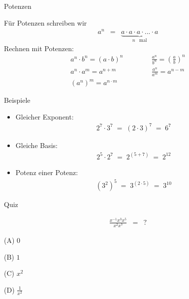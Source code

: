 \documentclass[german]{beamer}
\newcommand{\bq}{\begin{eqnarray*}}
\newcommand{\eq}{\end{eqnarray*}}
\begin{document}
\begin{frame}{Potenzen}

F\"ur Potenzen schreiben wir
\bq
 a^n & = & \underbrace{a \cdot a \cdot a \cdot ... \cdot a}_{n \;\;\;\mathrm{mal}}
\eq
Rechnen mit Potenzen:
\bq
 a^n \cdot b^n = \left( a \cdot b \right)^n
 & &
\;\;\;\;\;\;\;\;\;
 \frac{a^n}{b^n} = \left( \frac{a}{b} \right)^n
 \nonumber \\
 a^n \cdot a^m = a^{n+m}
 & &
\;\;\;\;\;\;\;\;\;
 \frac{a^n}{a^m} = a^{n-m}
 \nonumber \\
 \left( a^n \right)^m = a^{n\cdot m}
\eq

\end{frame}

\begin{frame}{Beispiele}

\begin{itemize}

\item Gleicher Exponent:
\bq
 2^7 \cdot 3^7 \; = \; \left(2 \cdot 3 \right)^7 \; = \; 6^7
\eq

\item Gleiche Basis:
\bq
 2^5 \cdot 2^7 \; = \; 2^{\left(5+7\right)} \; = \; 2^{12}
\eq

\item Potenz einer Potenz:
\bq
 \left(3^2\right)^5 \; = \; 3^{\left(2 \cdot 5 \right)} \; = \; 3^{10}
\eq

\end{itemize}

\end{frame}

\begin{frame}{Quiz}

\bq
 \frac{x^{-1} x^3 x^5}{x^2 x^{7}} & = & ?
\eq 
\begin{description}
\item{(A)} $0$
\item{(B)} $1$
\item{(C)} $x^2$
\item{(D)} $\frac{1}{x^2}$
\end{description}

\end{frame}
\end{document}
